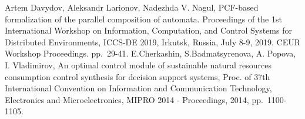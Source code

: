 \documentclass[conference]{IEEEtran}
\begin{document}
\begin{thebibliography}{999}
     Artem Davydov, Aleksandr Larionov, Nadezhda V. Nagul, PCF-based formalization of the parallel composition of automata. Proceedings of the 1st International Workshop on Information, Computation, and Control Systems for Distributed Environments, ICCS-DE 2019, Irkutsk, Russia, July 8-9, 2019. CEUR Workshop Proceedings. pp. 29-41.
     E.Cherkashin, S.Badmatsyrenova, A. Popova, I. Vladimirov, An optimal control module of sustainable natural resources consumption control synthesis for decision support systems, Proc. of 37th International Convention on Information and Communication Technology, Electronics and Microelectronics, MIPRO 2014 - Proceedings, 2014, pp. 1100-1105.

\end{thebibliography}
\end{document}
